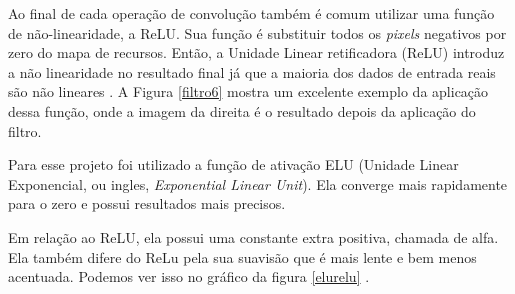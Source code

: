 Ao final de cada operação de convolução também é comum utilizar uma função de não-linearidade, a ReLU. Sua função é substituir todos os \textit{pixels} negativos por zero do mapa de recursos. Então, a Unidade Linear retificadora (ReLU) introduz a não linearidade no resultado final já que a maioria dos dados de entrada reais são não lineares \cite{conv2}.
A Figura \ref{filtro6} mostra um excelente exemplo da aplicação dessa função, onde a imagem da direita é o resultado depois da aplicação do filtro.

\begin{figure}[H]
	\centering
\end{figure}

Para esse projeto foi utilizado a função de ativação ELU (Unidade Linear Exponencial, ou ingles, \textit{Exponential Linear Unit}). Ela converge mais rapidamente para o zero e possui resultados mais precisos.

Em relação ao ReLU, ela possui uma constante extra positiva, chamada de alfa. Ela também difere do ReLu pela sua suavisão que é mais lente e bem menos acentuada. Podemos ver isso no gráfico da figura \ref{elurelu} \cite{elu}.

\begin{figure}[H]
	\centering
\end{figure}


